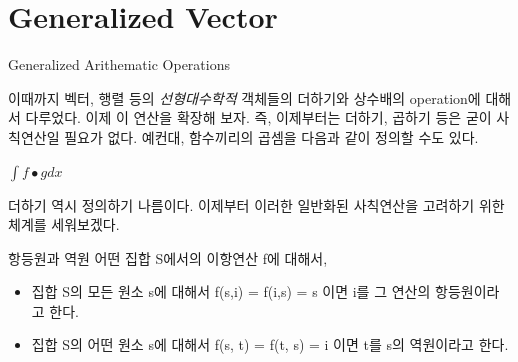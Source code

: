 \documentclass{beamer}
\begin{document}








\section{Generalized Vector}


\begin{frame}{Generalized Arithematic Operations} 

이때까지 벡터, 행렬 등의 \textit{선형대수학적} 객체들의 더하기와 상수배의 operation에 대해서 다루었다. 이제 이 연산을 확장해 보자. 즉, 이제부터는 더하기, 곱하기 등은 굳이 사칙연산일 필요가 없다. 예컨대, 함수끼리의 곱셈을 다음과 같이 정의할 수도 있다. 

$\int f \bullet g dx $ 

더하기 역시 정의하기 나름이다. 이제부터 이러한 일반화된 사칙연산을 고려하기 위한 체계를 세워보겠다. 

\end{frame}






\begin{frame}{항등원과 역원} 
어떤 집합 S에서의 이항연산 f에 대해서, 

\begin{itemize} 
\item 집합 S의 모든 원소 s에 대해서 f(s,i) = f(i,s) = s 이면 i를 그 연산의 항등원이라고 한다. 
\item 집합 S의 어떤 원소 s에 대해서 f(s, t) = f(t, s) = i 이면 t를 s의 역원이라고 한다. 
\end{itemize}
\end{frame}
\end{document}

